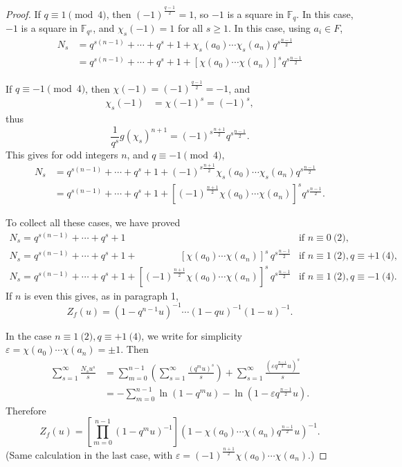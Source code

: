 \documentclass[11pt,a4paper]{article}
\newcommand{\F}{\mathbb{F}}
\begin{document}
\begin{proof}
If $q\equiv 1 \pmod 4$, then $(-1)^{\frac{q-1}{2}} = 1$, so $-1$ is a square in $\F_q$. In this case, $-1$ is a square in $\F_{q^s}$, and $\chi_s(-1) = 1$ for all $s\geq 1$.
In this case, using $a_i \in F$,
\begin{align*}
N_s &= q^{s(n-1)} + \cdots + q^s + 1 + \chi_s(a_0)\cdots \chi_s(a_n)q^{s\frac{n-1}{2}}\\
&= q^{s(n-1)} + \cdots + q^s + 1 + [\chi(a_0)\cdots \chi(a_n)]^s q^{s\frac{n-1}{2}}
\end{align*}

If $q\equiv -1 \pmod 4$, then $\chi(-1) = (-1)^{\frac{q-1}{2}} = -1$, and
\begin{align*}
\chi_s(-1) &=\chi(-1)^s = (-1)^s,
\end{align*}
thus 
$$\frac{1}{q^s} g(\chi_s)^{n+1} = (-1)^{s \frac{n+1}{2}}q^{s \frac{n-1}{2}}.$$
This gives for odd integers $n$, and $q \equiv -1 \pmod 4$,
\begin{align*}
N_s &= q^{s(n-1)} + \cdots + q^s + 1 +  (-1)^{s \frac{n+1}{2}} \chi_s(a_0)\cdots \chi_s(a_n) q^{s \frac{n-1}{2}}\\
&=  q^{s(n-1)} + \cdots + q^s + 1 +  [(-1)^{ \frac{n+1}{2}} \chi(a_0)\cdots \chi(a_n)]^s q^{s \frac{n-1}{2}}.
\end{align*}


To collect all these cases, we have proved
$$
\begin{array}{ll}
N_s = q^{s(n-1)} + \cdots + q^s + 1 &\text{if  } n\equiv 0 \pod 2,\\
N_s = q^{s(n-1)} + \cdots + q^s + 1 + \phantom{(-1)^{ \frac{n+1}{2}}}[\chi(a_0)\cdots \chi(a_n)]^s\, q^{s\frac{n-1}{2}} &\text{if } n \equiv 1 \pod 2, q \equiv +1 \pod 4,\\
N_s = q^{s(n-1)} + \cdots + q^s + 1 +[(-1)^{ \frac{n+1}{2}} \chi(a_0)\cdots \chi(a_n)]^s\, q^{s \frac{n-1}{2}}& \text{if }n \equiv 1 \pod 2, q \equiv -1 \pod 4.
\end{array}
$$
If $n$ is even this gives, as in paragraph 1, 
$$Z_f(u)  = (1-q^{n-1}u)^{-1}\cdots (1-qu)^{-1}(1-u)^{-1}.$$


In the case $n \equiv 1 \pod 2, q \equiv +1 \pod 4$, we write for simplicity $\varepsilon = \chi(a_0)\cdots \chi(a_n) =\pm 1$.
Then 
\begin{align*}
\sum_{s=1}^\infty \frac{N_su^s}{s} &= \sum_{m=0}^{n-1}\left( \sum_{s=1}^\infty \frac{(q^m u)^s}{s} \right) + \sum_{s=1}^\infty \frac{ (\varepsilon q^\frac{n-1}{2} u)^s}{s}\\
&=  - \sum_{m=0}^{n-1} \ln(1-q^m u) -  \ln(1- \varepsilon q^\frac{n-1}{2}u).
\end{align*}
Therefore
$$Z_f(u) = \left[\prod_{m=0}^{n-1} (1 -q^mu)^{-1}\right] (1 - \chi(a_0)\cdots \chi(a_n) q^\frac{n-1}{2}u)^{-1}.$$
(Same calculation in the last case, with $\varepsilon = (-1)^{ \frac{n+1}{2}} \chi(a_0)\cdots \chi(a_n)$.)


\end{proof}
\end{document}
